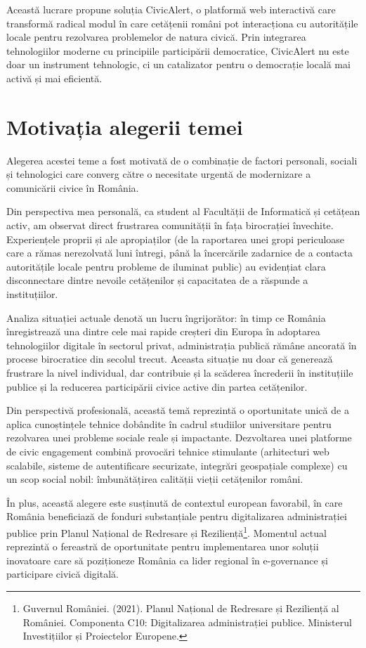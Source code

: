 \documentclass[12pt,a4paper]{report}
\begin{document}
Această lucrare  propune soluția CivicAlert, o platformă web interactivă care transformă radical modul în care cetățenii români pot interacționa cu autoritățile locale pentru rezolvarea problemelor de natura civică. Prin integrarea tehnologiilor moderne cu principiile participării democratice, CivicAlert nu este doar un instrument tehnologic, ci un catalizator pentru o democrație locală mai activă și mai eficientă.
\section*{Motivația alegerii temei}

Alegerea acestei teme a fost motivată de o combinație de factori personali, sociali și tehnologici care converg către o necesitate urgentă de modernizare a comunicării civice în România.

Din perspectiva mea personală, ca student al Facultății de Informatică și cetățean activ, am observat direct frustrarea comunității în fața birocrației învechite. Experiențele proprii și ale apropiaților (de la raportarea unei gropi periculoase care a rămas nerezolvată luni întregi, până la încercările zadarnice de a contacta autoritățile locale pentru probleme de iluminat public) au evidențiat clara disconnectare dintre nevoile cetățenilor și capacitatea de a răspunde a instituțiilor.

Analiza situației actuale denotă un lucru îngrijorător: în timp ce România înregistrează una dintre cele mai rapide creșteri din Europa în adoptarea tehnologiilor digitale în sectorul privat, administrația publică rămâne ancorată în procese birocratice din secolul trecut. Aceasta situație nu doar că generează frustrare la nivel individual, dar contribuie și la scăderea încrederii în instituțiile publice și la reducerea participării civice active din partea cetățenilor.

Din perspectivă profesională, această temă reprezintă o oportunitate unică de a aplica cunoștințele tehnice dobândite în cadrul studiilor universitare pentru rezolvarea unei probleme sociale reale și impactante. Dezvoltarea unei platforme de civic engagement combină provocări tehnice stimulante (arhitecturi web scalabile, sisteme de autentificare securizate, integrări geospațiale complexe) cu un scop social nobil:  îmbunătățirea calității vieții cetățenilor români.

În plus, această alegere este susținută de contextul european favorabil, în care România beneficiază de fonduri substanțiale pentru digitalizarea administrației publice prin Planul Național de Redresare și Reziliență\footnote{Guvernul României. (2021). Planul Național de Redresare și Reziliență al României. Componenta C10: Digitalizarea administrației publice. Ministerul Investițiilor și Proiectelor Europene.}. Momentul actual reprezintă o fereastră de oportunitate pentru implementarea unor soluții inovatoare care să poziționeze România ca lider regional în e-governance și participare civică digitală.
\end{document}
